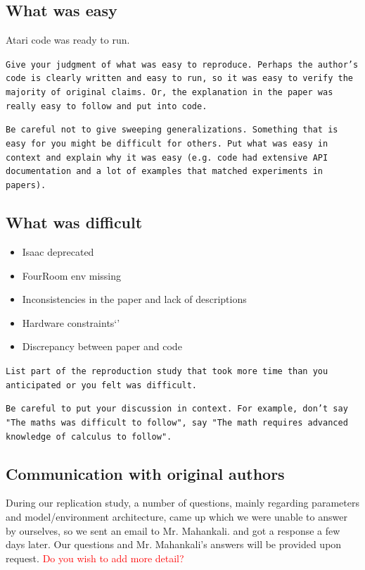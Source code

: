 \documentclass[10pt]{article} %
\begin{document}
\subsection{What was easy}
Atari code was ready to run. 

\texttt{Give your judgment of what was easy to reproduce. Perhaps the author's code is clearly written and easy to run, so it was easy to verify the majority of original claims. Or, the explanation in the paper was really easy to follow and put into code.}

\texttt{Be careful not to give sweeping generalizations. Something that is easy for you might be difficult for others. Put what was easy in context and explain why it was easy (e.g. code had extensive API documentation and a lot of examples that matched experiments in papers).}

\subsection{What was difficult}
\begin{itemize}
  \item Isaac deprecated 
  \item FourRoom env missing
  \item Inconsistencies in the paper and lack of descriptions
  \item Hardware constraints`'
  \item Discrepancy between paper and code
\end{itemize}
\texttt{List part of the reproduction study that took more time than you anticipated or you felt was difficult.}

\texttt{Be careful to put your discussion in context. For example, don't say "The maths was difficult to follow", say "The math requires advanced knowledge of calculus to follow".}

\subsection{Communication with original authors}

\noindent During our replication study, a number of questions, mainly regarding parameters and model/environment architecture, came up which we were unable to answer by ourselves, so we sent an email to Mr. Mahankali. and got a response a few days later. Our questions and Mr. Mahankali's answers will be provided upon request. \textcolor{red}{Do you wish to add more detail?}
\end{document}
